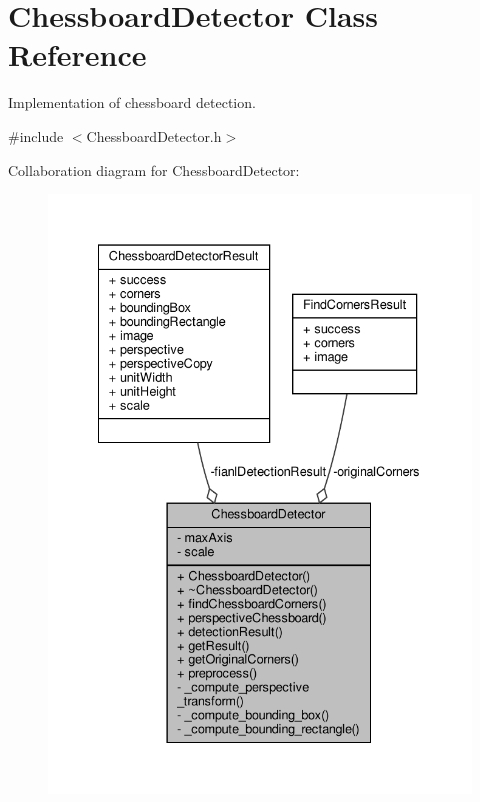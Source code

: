 \hypertarget{class_chessboard_detector}{}\section{Chessboard\+Detector Class Reference}
\label{class_chessboard_detector}


Implementation of chessboard detection.  




{\ttfamily \#include $<$Chessboard\+Detector.\+h$>$}



Collaboration diagram for Chessboard\+Detector\+:\nopagebreak
\begin{figure}[H]
\begin{center}
\leavevmode
\includegraphics[width=335pt]{class_chessboard_detector__coll__graph}
\end{center}
\end{figure}
